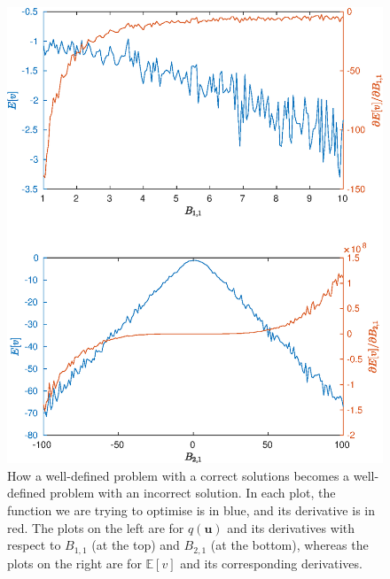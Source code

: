 \documentclass{mpaper}
\begin{document}
\begin{figure}
\begin{minipage}{.5\textwidth}
    \includegraphics[width=\columnwidth]{elbo_over_B_short}
  \end{minipage}
  \caption{How a well-defined problem with a correct solutions becomes a
    well-defined problem with an incorrect solution. In each plot, the function
    we are trying to optimise is in blue, and its derivative is in red. The
    plots on the left are for $q(\mathbf{u})$ and its derivatives with respect
    to $B_{1,1}$ (at the top) and $B_{2,1}$ (at the bottom), whereas the plots
    on the right are for $\mathbb{E}[v]$ and its corresponding derivatives.}
\end{figure}


\end{document}
